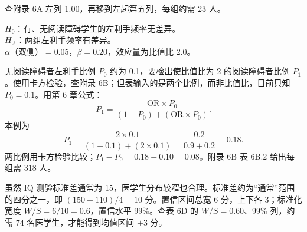 \begin{answerlist}
查附录 6A 左列 1.00，再移到左起第五列，每组约需 23 人。
\item[4.] $H_0$：有、无阅读障碍学生的左利手频率无差异。\\
$H_A$：两组左利手频率有差异。\\
$\alpha$（双侧）$=0.05$，$\beta=0.20$，效应量为比值比 2.0。

无阅读障碍者左利手比例 $P_0$ 约为 0.1，要检出使比值比为 2 的阅读障碍者比例 $P_1$。使用卡方检验，查附录 6B；但表输入的是两个比例，而非比值比，目前只知 $P_0=0.1$。用第 6 章公式：
\[
P_1=\frac{\mathrm{OR}\times P_0}{(1-P_0)+(\mathrm{OR}\times P_0)}.
\]
本例为
\[
P_1=\frac{2\times0.1}{(1-0.1)+(2\times0.1)}
=\frac{0.2}{0.9+0.2}=0.18.
\]
两比例用卡方检验比较；$P_1-P_0=0.18-0.10=0.08$。附录 6B 表 6B.2 给出每组需 318 人。
\item[5.] 虽然 IQ 测验标准差通常为 15，医学生分布较窄也合理。标准差约为“通常”范围的四分之一，即 $(150-110)/4=10$ 分。置信区间总宽 6 分，上下各 3；标准化宽度 $W/S=6/10=0.6$，置信水平 99\%。查表 6D 的 $W/S=0.60$、99\% 列，约需 74 名医学生，才能得到均值区间 $\pm3$ 分。
\end{answerlist}

